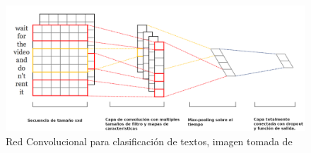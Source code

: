 \begin{figure}[hbt!]
\centering
\includegraphics[width=0.7 \textwidth]{sections/figures/cnn.png}
\caption{Red Convolucional para clasificación de textos, imagen tomada de \cite{kim2014convolutional}} \label{fig:cnn_kim}
\end{figure}
